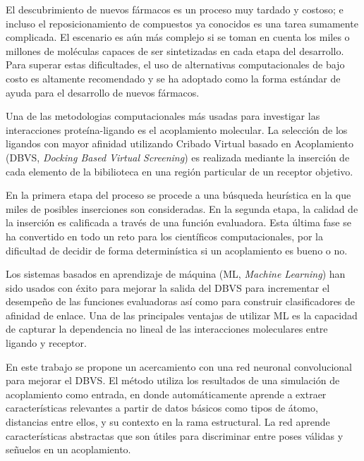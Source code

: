 El descubrimiento de nuevos fármacos es un proceso muy tardado y
costoso; e incluso el reposicionamiento de compuestos ya conocidos es
una tarea sumamente complicada. El escenario es aún más complejo si
se toman en cuenta los miles o millones de moléculas capaces de ser
sintetizadas en cada etapa del desarrollo.  Para superar estas
dificultades, el uso de alternativas computacionales de bajo costo es
altamente recomendado y se ha adoptado como la forma estándar de
ayuda para el desarrollo de nuevos fármacos.

Una de las metodologias computacionales más usadas para investigar las
interacciones proteína-ligando es el acoplamiento molecular. La
selección de los ligandos con mayor afinidad utilizando Cribado
Virtual basado en Acoplamiento (DBVS, \textit{Docking Based Virtual
  Screening}) es realizada mediante la inserción de cada elemento de
la bibilioteca en una región particular de un receptor objetivo.

En la primera etapa del proceso se procede a una búsqueda heurística
en la que miles de posibles inserciones son consideradas. En la
segunda etapa, la calidad de la inserción es calificada a través de
una función evaluadora. Esta última fase se ha convertido en todo un
reto para los científicos computacionales, por la dificultad de
decidir de forma determinística si un acoplamiento es bueno o no.

Los sistemas basados en aprendizaje de máquina (ML, \textit{Machine
  Learning}) han sido usados con éxito para mejorar la salida del DBVS
para incrementar el desempeño de las funciones evaluadoras así como
para construir clasificadores de afinidad de enlace. Una de las
principales ventajas de utilizar ML es la capacidad de capturar la
dependencia no lineal de las interacciones moleculares entre ligando y
receptor.

En este trabajo se propone un acercamiento con una red neuronal
convolucional para mejorar el DBVS. El método utiliza los resultados
de una simulación de acoplamiento como entrada, en donde
automáticamente aprende a extraer características relevantes a partir
de datos básicos como tipos de átomo, distancias entre ellos, y su
contexto en la rama estructural. La red aprende características
abstractas que son útiles para discriminar entre poses válidas y
señuelos en un acoplamiento.
